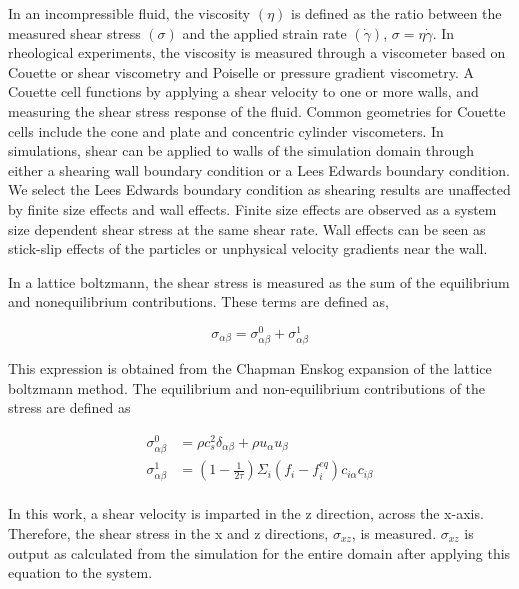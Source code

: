In an incompressible fluid, the viscosity $(\eta)$ is defined as the ratio between the measured 
shear stress $(\sigma)$ and the applied strain rate $(\dot{\gamma})$, $\sigma = \eta \dot{\gamma}$. In rheological 
experiments, the viscosity is measured through a viscometer based on Couette or shear viscometry and Poiselle or 
pressure gradient viscometry. A Couette cell functions by applying a shear velocity to one or more walls, and measuring 
the shear stress response of the fluid. Common geometries for Couette cells include the cone and plate and concentric 
cylinder viscometers. In simulations, shear can be applied to walls of the simulation domain through either a shearing 
wall boundary condition or a Lees Edwards boundary condition. We select the Lees Edwards boundary condition as shearing 
results are unaffected by finite size effects and wall effects. Finite size effects are observed as a system size
dependent shear stress at the same shear rate. Wall effects can be seen as stick-slip effects of the particles or 
unphysical velocity gradients near the wall.

In a lattice boltzmann, the shear stress is measured as the sum of the equilibrium and nonequilibrium contributions.
\cite{kruger_shear_2009} These terms are defined as,

\begin{equation}
    \sigma_{\alpha \beta} = \sigma_{\alpha \beta}^{0} + \sigma_{\alpha \beta}^{1}
\end{equation}

This expression is obtained from the Chapman Enskog expansion of the lattice boltzmann method. The equilibrium and
non-equilibrium contributions of the stress are defined as

\begin{equation}
    \begin{split}
        \sigma_{\alpha \beta}^{0} &= \rho c_s^2 \delta_{\alpha \beta} + \rho u_{\alpha} u_{\beta} \\
        \sigma_{\alpha \beta}^{1} &= (1 - \frac{1}{2 \tau})\Sigma_{i} (f_{i} - f_{i}^{eq})c_{i \alpha}c_{i \beta} \\
    \end{split}
\end{equation}

In this work, a shear velocity is imparted in the z direction, across the x-axis. Therefore, the shear stress in the x 
and z directions, $\sigma_{xz}$, is measured. $\sigma_{xz}$ is output as calculated from the simulation for the entire 
domain after applying this equation to the system. 

